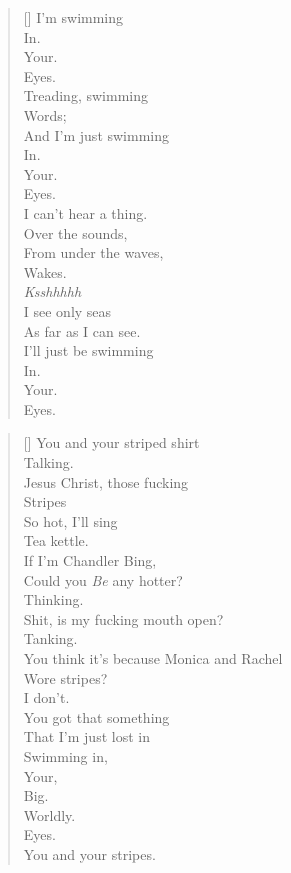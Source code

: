 \documentclass{article}
\begin{document}
\settowidth{\versewidth}{Than Tycho Brahe, or Erra Pater:}
\begin{verse}[\versewidth]
I'm swimming \\
In. \\
Your. \\
Eyes. \\
Treading, swimming \\
Words; \\
And I'm just swimming \\
In. \\
Your. \\
Eyes. \\
I can't hear a thing. \\
Over the sounds, \\
From under the waves, \\
Wakes. \\
\textit{Ksshhhhh}\\
I see only seas \\
As far as I can see. \\
I'll just be swimming \\
In. \\
Your. \\
Eyes. \\
\end{verse}

\newpage
{}
\settowidth{\versewidth}{Than Tycho Brahe, or Erra Pater:}
\begin{verse}[\versewidth]
You and your striped shirt \\
Talking. \\
Jesus Christ, those fucking \\
Stripes \\
So hot, I'll sing \\
Tea kettle. \\
If I'm Chandler Bing, \\
Could you \textit{Be} any hotter? \\
Thinking. \\
Shit, is my fucking mouth open? \\
Tanking. \\
You think it's because Monica and Rachel \\
Wore stripes? \\
I don't. \\
You got that something \\
That I'm just lost in \\
Swimming in, \\
Your, \\
Big. \\
Worldly. \\
Eyes. \\
You and your stripes. \\
\end{verse}
\end{document}
